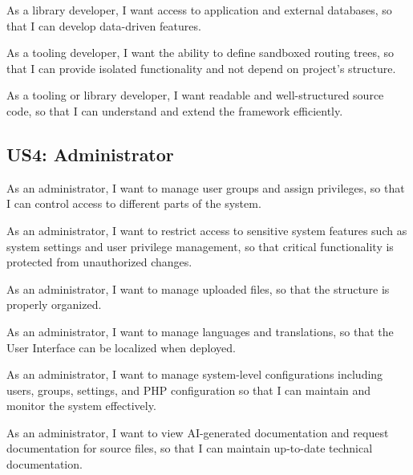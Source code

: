 As a library developer,
I want access to application and external databases,
so that I can develop data-driven features.

As a tooling developer,
I want the ability to define sandboxed routing trees,
so that I can provide isolated functionality and not depend on project's structure.

As a tooling or library developer,
I want readable and well-structured source code,
so that I can understand and extend the framework efficiently.

\subsection*{US4: Administrator}
As an administrator,
I want to manage user groups and assign privileges,
so that I can control access to different parts of the system.

As an administrator,
I want to restrict access to sensitive system features such as system settings and user privilege management,
so that critical functionality is protected from unauthorized changes.

As an administrator,
I want to manage uploaded files,
so that the structure is properly organized.

As an administrator,
I want to manage languages and translations,
so that the User Interface can be localized when deployed.

As an administrator,
I want to manage system-level configurations including users, groups, settings, and PHP configuration
so that I can maintain and monitor the system effectively.

As an administrator,
I want to view AI-generated documentation and request documentation for source files,
so that I can maintain up-to-date technical documentation.